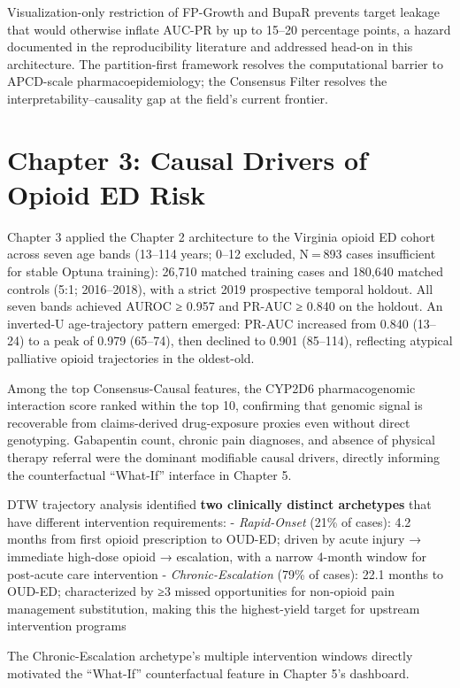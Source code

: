 \documentclass[
  12pt,
]{book}
\begin{document}
Visualization-only restriction of FP-Growth and BupaR prevents target
leakage that would otherwise inflate AUC-PR by up to 15--20 percentage
points, a hazard documented in the reproducibility literature and
addressed head-on in this architecture. The partition-first framework
resolves the computational barrier to APCD-scale pharmacoepidemiology;
the Consensus Filter resolves the interpretability--causality gap at the
field's current frontier.

\section{Chapter 3: Causal Drivers of Opioid ED
Risk}\label{chapter-3-causal-drivers-of-opioid-ed-risk}

Chapter 3 applied the Chapter 2 architecture to the Virginia opioid ED
cohort across seven age bands (13--114 years; 0--12 excluded, N = 893
cases insufficient for stable Optuna training): 26,710 matched training
cases and 180,640 matched controls (5:1; 2016--2018), with a strict 2019
prospective temporal holdout. All seven bands achieved AUROC ≥ 0.957 and
PR-AUC ≥ 0.840 on the holdout. An inverted-U age-trajectory pattern
emerged: PR-AUC increased from 0.840 (13--24) to a peak of 0.979
(65--74), then declined to 0.901 (85--114), reflecting atypical
palliative opioid trajectories in the oldest-old.

Among the top Consensus-Causal features, the CYP2D6 pharmacogenomic
interaction score ranked within the top 10, confirming that genomic
signal is recoverable from claims-derived drug-exposure proxies even
without direct genotyping. Gabapentin count, chronic pain diagnoses, and
absence of physical therapy referral were the dominant modifiable causal
drivers, directly informing the counterfactual ``What-If'' interface in
Chapter 5.

DTW trajectory analysis identified \textbf{two clinically distinct
archetypes} that have different intervention requirements: -
\emph{Rapid-Onset} (21\% of cases): 4.2 months from first opioid
prescription to OUD-ED; driven by acute injury → immediate high-dose
opioid → escalation, with a narrow 4-month window for post-acute care
intervention - \emph{Chronic-Escalation} (79\% of cases): 22.1 months to
OUD-ED; characterized by ≥3 missed opportunities for non-opioid pain
management substitution, making this the highest-yield target for
upstream intervention programs

The Chronic-Escalation archetype's multiple intervention windows
directly motivated the ``What-If'' counterfactual feature in Chapter 5's
dashboard.
\end{document}
